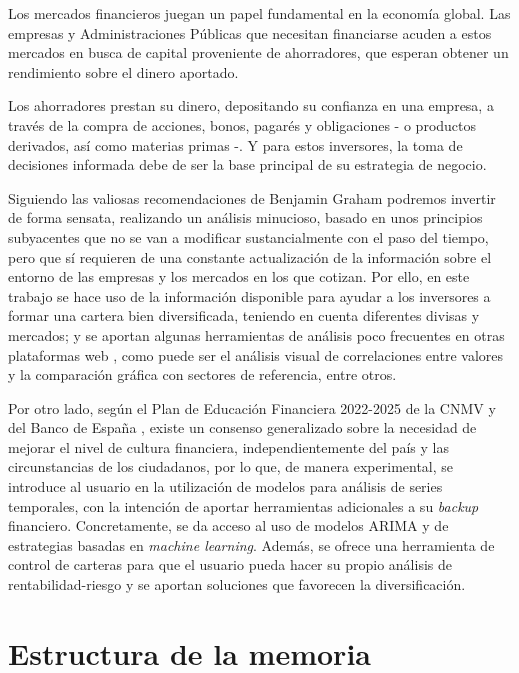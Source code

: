 
Los mercados financieros juegan un papel fundamental en la economía global. 
Las empresas y Administraciones Públicas que necesitan financiarse acuden a 
estos mercados en busca de capital proveniente de ahorradores, que esperan 
obtener un rendimiento sobre el dinero aportado. 

Los ahorradores prestan su dinero, depositando su confianza en una empresa,
 a través de la compra de acciones, bonos, pagarés y obligaciones - o productos
 derivados, así como materias primas -. Y para estos inversores, la toma de 
 decisiones informada debe de ser la base principal de su estrategia de negocio. 

Siguiendo las valiosas recomendaciones de Benjamin Graham \citep{book:Inversor_inteligente}
 podremos invertir de forma sensata, realizando un análisis minucioso, basado 
 en unos principios subyacentes que no se van a modificar sustancialmente con 
 el paso del tiempo, pero que sí requieren de una constante actualización de 
 la información sobre el entorno de las empresas y los mercados en los que 
 cotizan. Por ello, en este trabajo se hace uso de la información disponible 
 para ayudar a los inversores a formar una cartera bien diversificada, teniendo 
 en cuenta diferentes divisas y mercados; y se aportan algunas herramientas de 
 análisis poco frecuentes en otras plataformas web \citep{online:MarketScreener,online:Investing,online:Bloomberg}, 
 como puede ser el análisis visual de correlaciones entre valores y la 
 comparación gráfica con sectores de referencia, entre otros. 
 
Por otro lado, según el Plan de Educación Financiera 2022-2025 \citep{report:cnmv_informe} 
 de la CNMV \citep{online:cnmv_portal} y del Banco de España \citep{online:bde}, existe un consenso 
 generalizado sobre la necesidad de mejorar el nivel de cultura financiera, 
 independientemente del país y las circunstancias de los ciudadanos, por lo que, de 
 manera experimental, se introduce al usuario en la utilización de modelos para análisis 
 de series temporales, con la intención de aportar herramientas adicionales a su \textit{backup} 
 financiero. Concretamente, se da acceso al uso de modelos ARIMA \citep{wiki:ARIMA} 
 y de estrategias basadas en \emph{machine learning}. Además, se ofrece una herramienta de control de carteras para que el usuario pueda hacer su propio análisis de rentabilidad-riesgo y se aportan soluciones que favorecen la diversificación. 


\section{Estructura de la memoria}\label{estructura-de-la-memoria}

